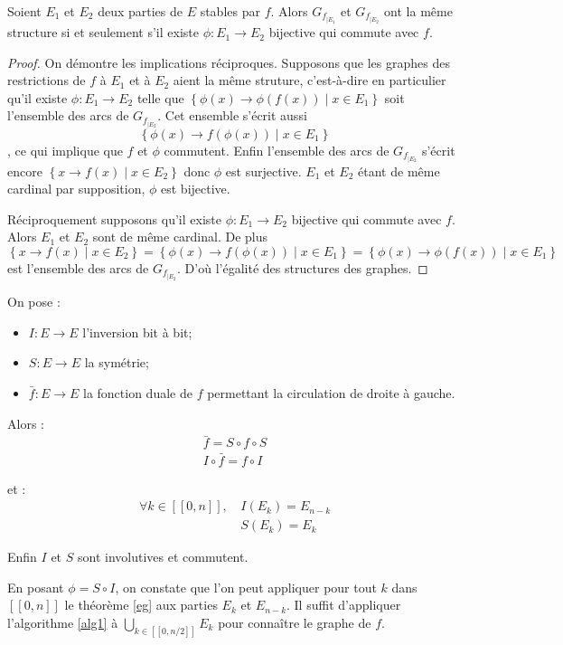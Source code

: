\begin{thm}\label{eg}
Soient $E_1$ et $E_2$ deux parties de $E$ stables par $f$. Alors $G_{f_{|E_{1}}}$ et $G_{f_{|E_{2}}}$ ont la m\^eme structure si et seulement s'il existe $\phi:E_{1}\rightarrow E_{2}$ bijective qui commute avec $f$.
\end{thm}
\begin{proof}
On d\'emontre les implications r\'eciproques.
Supposons que les graphes des restrictions de $f$ \`a $E_1$ et \`a $E_2$ aient la m\^eme struture, c'est-\`a-dire en particulier qu'il existe $\phi:E_{1}\rightarrow E_{2}$ telle que $\left\{\phi(x)\rightarrow \phi(f(x)) \middle| x\in E_{1}\right\}$ soit l'ensemble des arcs de $G_{f_{|E_{2}}}$. Cet ensemble s'\'ecrit aussi \[\left\{\phi(x)\rightarrow f(\phi(x)) \middle| x\in E_{1}\right\}\], ce qui implique que $f$ et $\phi$ commutent. Enfin l'ensemble des arcs de $G_{f_{|E_{2}}}$ s'\'ecrit encore $\left\{x\rightarrow f(x) \middle| x\in E_{2}\right\}$ donc $\phi$ est surjective. $E_1$ et $E_2$ \'etant de m\^eme cardinal par supposition, $\phi$ est bijective.

R\'eciproquement supposons qu'il existe $\phi:E_{1}\rightarrow E_{2}$ bijective qui commute avec $f$. Alors $E_1$ et $E_2$ sont de m\^eme cardinal. De plus \[\left\{x\rightarrow f(x) \middle| x\in E_{2}\right\}=\left\{\phi(x)\rightarrow f(\phi(x)) \middle| x\in E_{1}\right\}=\left\{\phi(x)\rightarrow \phi(f(x)) \middle| x\in E_{1}\right\}\] est l'ensemble des arcs de $G_{f_{|E_{2}}}$. D'o\`u l'\'egalit\'e des structures des graphes.
\end{proof}

\begin{csq}
On pose :

\begin{itemize}
\item $I:E\rightarrow E$ l'inversion bit \`a bit;
\item $S:E\rightarrow E$ la sym\'etrie;
\item $\bar{f}:E\rightarrow E$ la fonction duale de $f$ permettant la circulation de droite \`a gauche.
\end{itemize}

Alors :
\begin{align*}
\bar{f}=S\circ f\circ S\\ I\circ \bar{f} = f\circ I
\end{align*}

et :
\begin{align*}
\forall k\in [\![0, n]\!],\, &I(E_{k}) = E_{n-k}\\&S(E_{k}) = E_{k}
\end{align*}

Enfin $I$ et $S$ sont involutives et commutent.

En posant $\phi=S\circ I$, on constate que l'on peut appliquer pour tout $k$ dans $[\![0, n]\!]$ le th\'eor\`eme \ref{eg} aux parties $E_k$ et $E_{n-k}$. Il suffit d'appliquer l'algorithme \ref{alg1} \`a $\bigcup_{k\in [\![0, n/2]\!]}E_k$ pour conna\^itre le graphe de $f$.
\end{csq}

